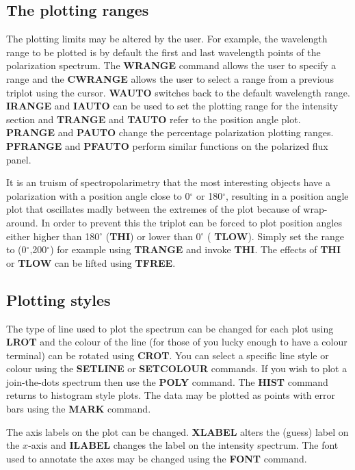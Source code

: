 \subsection{The plotting ranges}

The plotting limits may be altered by the user. For example, the
wavelength range to be plotted is by default the first and last
wavelength points of the polarization spectrum. The {\bf WRANGE}
command allows the user to specify a range and the {\bf CWRANGE}
allows the user to select a range from a previous triplot using the
cursor. {\bf WAUTO} switches back to the default wavelength range.
{\bf IRANGE} and {\bf IAUTO} can be used to set the plotting range for
the intensity section and {\bf TRANGE} and {\bf TAUTO} refer to the
position angle plot. {\bf PRANGE} and {\bf PAUTO} change the
percentage polarization plotting ranges. {\bf PFRANGE} and {\bf
PFAUTO} perform similar functions on the polarized flux panel.

It is an truism of spectropolarimetry that the most interesting objects
have a polarization with a position angle close to 0$^\circ$ or
180$^\circ$, resulting in a position angle plot that oscillates madly
between the extremes of the plot because of wrap-around. In order to
prevent this the triplot can be forced to plot position angles either
higher than 180$^\circ$ ({\bf THI}) or lower than 0$^\circ$ ({\bf
TLOW}). Simply set the range to (0$^\circ$,200$^\circ$) for
example using {\bf TRANGE} and invoke {\bf THI}. The effects of {\bf
THI} or {\bf TLOW} can be lifted using {\bf TFREE}.

\subsection{Plotting styles}

The type of line used to plot the spectrum can be changed for each
plot using {\bf LROT} and the colour of the line (for those of you
lucky enough to have a colour terminal) can be rotated using {\bf
CROT}. You can select a specific line style or colour using the {\bf
SETLINE} or {\bf SETCOLOUR} commands. If you wish to plot a
join-the-dots spectrum then use the {\bf POLY} command. The {\bf
HIST} command returns to histogram style plots. The data may be
plotted as points with error bars using the {\bf MARK} command.

The axis labels on the plot can be changed. {\bf XLABEL} alters the
(guess) label on the $x$-axis and {\bf ILABEL} changes the label on
the intensity spectrum. The font used to annotate the axes may be
changed using the {\bf FONT} command.

